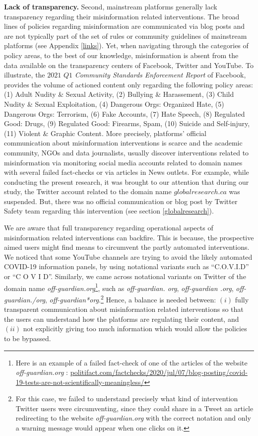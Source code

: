 \documentclass{article}
\begin{document}
{\bf Lack of transparency.} Second, mainstream platforms generally lack transparency regarding their misinformation related interventions.  The broad lines of policies regarding misinformation are communicated via blog posts and are not typically part of the set of rules or community guidelines of mainstream platforms (see Appendix \ref{links}). Yet, when navigating through the categories of policy areas, to the best of our knowledge, misinformation is absent from the data available on the transparency centers of Facebook, Twitter and YouTube. To illustrate, the $2021$ $Q1$ {\it Community Standards Enforcement Report} of Facebook, provides the volume of actioned content only regarding the following policy areas: (1) Adult Nudity \& Sexual Activity, (2) Bullying \& Harassement, (3) Child Nudity \& Sexual Exploitation, (4) Dangerous Orgs: Organized Hate, (5) Dangerous Orgs: Terrorism, (6) Fake Accounts, (7) Hate Speech, (8) Regulated Good: Drugs, (9) Regulated Good: Firearms, Spam, (10) Suicide and Self-injury, (11) Violent \& Graphic Content. More precisely, platforms' official communication about misinformation interventions is scarce and the academic community, NGOs and data journalists, usually discover interventions related to misinformation via monitoring social media accounts related to domain names with several failed fact-checks or via articles in News outlets. For example, while conducting the present research, it was brought to our attention that during our study, the Twitter account related to the domain name $globalresearch.ca$ was suspended. But, there was no official communication or blog post by Twitter Safety team regarding this intervention (see section \ref{globalresearch}). 

We are aware that full transparency regarding operational aspects of misinformation related interventions can backfire. This is because, the prospective aimed users might find means to circumvent the partly automated interventions. We noticed that some YouTube channels are trying to avoid the likely automated COVID-19 information panels, by using notational variants such as ``C.O.V.I.D'' or ``C O V I D''. Similarly, we came across notational variants on Twitter of the domain name {\it off-guardian.org}\footnote{Here is an example of a failed fact-check of one of the articles of the website {\it off-guardian.org} : \href{https://www.politifact.com/factchecks/2020/jul/07/blog-posting/covid-19-tests-are-not-scientifically-meaningless/}{politifact.com/factchecks/2020/jul/07/blog-posting/covid-19-tests-are-not-scientifically-meaningless/}}, such as {\it off-guardian. org}, {\it off-guardian .org}, {\it off-guardian./org}, {\it off-guardian*org}.\footnote{For this case, we failed to understand precisely what kind of intervention Twitter users were circumventing, since they could share in a Tweet an article redirecting to the website {\it off-guardian.org} with the correct notation and only a warning message would appear when one clicks on it.} Hence, a balance is needed between: $(i)$ fully transparent communication about misinformation related interventions so that the users can understand how the platforms are regulating their content, and $(ii)$ not explicitly giving too much information which would allow the policies to be bypassed.
\end{document}
